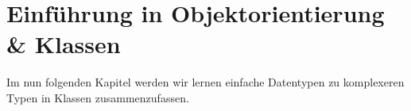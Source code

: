 \chapter{Einführung in Objektorientierung \& Klassen}
\pagestyle{empty}

Im nun folgenden Kapitel werden wir lernen einfache Datentypen zu komplexeren Typen in Klassen zusammenzufassen.






\pagestyle{empty}
